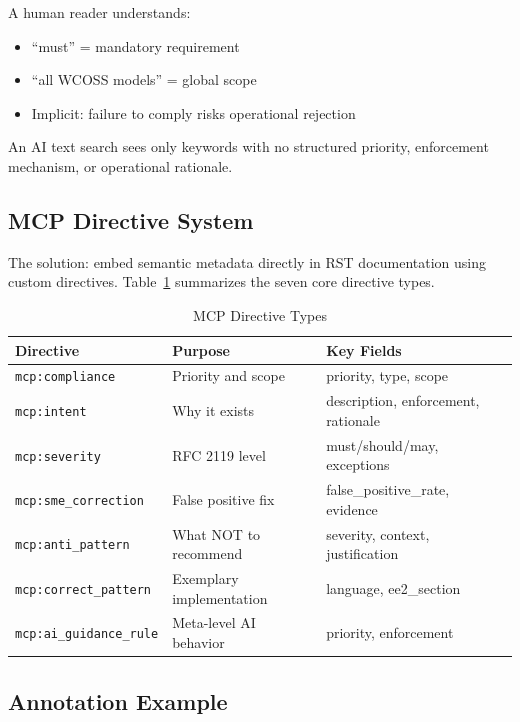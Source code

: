 \documentclass[11pt,letterpaper]{article}
\begin{document}
A human reader understands:
\begin{itemize}
    \item ``must'' = mandatory requirement
    \item ``all WCOSS models'' = global scope
    \item Implicit: failure to comply risks operational rejection
\end{itemize}

An AI text search sees only keywords with no structured priority, enforcement mechanism, or operational rationale.

\subsection{MCP Directive System}

The solution: embed semantic metadata directly in RST documentation using custom directives. Table~\ref{tab:directives} summarizes the seven core directive types.

\begin{table}[H]
\centering
\caption{MCP Directive Types}
\label{tab:directives}
\begin{tabular}{@{}lll@{}}
\toprule
\textbf{Directive} & \textbf{Purpose} & \textbf{Key Fields} \\
\midrule
\texttt{mcp:compliance} & Priority and scope & priority, type, scope \\
\texttt{mcp:intent} & Why it exists & description, enforcement, rationale \\
\texttt{mcp:severity} & RFC 2119 level & must/should/may, exceptions \\
\texttt{mcp:sme\_correction} & False positive fix & false\_positive\_rate, evidence \\
\texttt{mcp:anti\_pattern} & What NOT to recommend & severity, context, justification \\
\texttt{mcp:correct\_pattern} & Exemplary implementation & language, ee2\_section \\
\texttt{mcp:ai\_guidance\_rule} & Meta-level AI behavior & priority, enforcement \\
\bottomrule
\end{tabular}
\end{table}

\subsection{Annotation Example}
\end{document}
